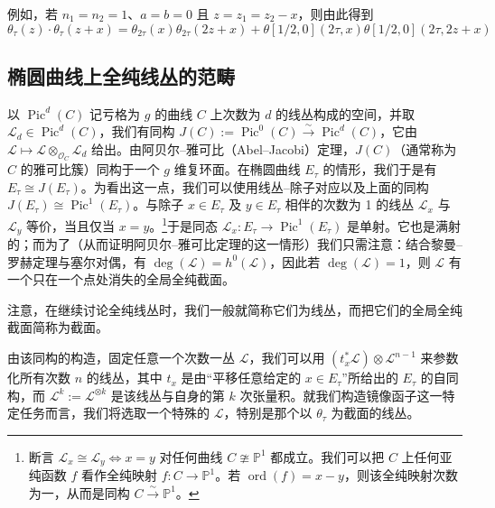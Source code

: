 \documentclass[11pt,a4paper]{article}
\theoremstyle{plain}
\theoremstyle{definition}
\begin{document}
例如，若 $n_1=n_2=1$、$a=b=0$ 且 $z=z_1=z_2-x$，则由此得到
\begin{equation}
\tag{4.1}
\theta_\tau(z)\cdot\theta_\tau(z+x)=\theta_{2\tau}(x)\theta_{2\tau}(2z+x)+\theta[1/2,0](2\tau,x)\theta[1/2,0](2\tau,2z+x)
\end{equation}

\subsection{椭圆曲线上全纯线丛的范畴}

以 $\operatorname{Pic}^d(C)$ 记亏格为 $g$ 的曲线 $C$ 上次数为 $d$ 的线丛构成的空间，并取 $\mathcal{L}_d\in\operatorname{Pic}^d(C)$，我们有同构 $J(C):=\operatorname{Pic}^0(C)\xrightarrow{\ \sim\ }\operatorname{Pic}^d(C)$，它由 $\mathcal{L}\mapsto\mathcal{L}\otimes_{\mathcal{O}_C}\mathcal{L}_d$ 给出。由阿贝尔–雅可比（Abel--Jacobi）定理，$J(C)$（通常称为 $C$ 的雅可比簇）同构于一个 $g$ 维复环面。在椭圆曲线 $E_\tau$ 的情形，我们于是有 $E_\tau\cong J(E_\tau)$。为看出这一点，我们可以使用线丛–除子对应以及上面的同构 $J(E_\tau)\cong\operatorname{Pic}^1(E_\tau)$。与除子 $x\in E_\tau$ 及 $y\in E_\tau$ 相伴的次数为 1 的线丛 $\mathcal{L}_x$ 与 $\mathcal{L}_y$ 等价，当且仅当 $x=y$。\footnote{断言 $\mathcal{L}_x\cong\mathcal{L}_y\iff x=y$ 对任何曲线 $C\ncong\mathbb{P}^1$ 都成立。我们可以把 $C$ 上任何亚纯函数 $f$ 看作全纯映射 $f\colon C\to\mathbb{P}^1$。若 $\operatorname{ord}(f)=x-y$，则该全纯映射次数为一，从而是同构 $C\xrightarrow{\sim}\mathbb{P}^1$。}于是同态 $\mathcal{L}_x\colon E_\tau\to\operatorname{Pic}^1(E_\tau)$ 是单射。它也是满射的；而为了（从而证明阿贝尔–雅可比定理的这一情形）我们只需注意：结合黎曼–罗赫定理与塞尔对偶，有 $\deg(\mathcal{L})=h^0(\mathcal{L})$，因此若 $\deg(\mathcal{L})=1$，则 $\mathcal{L}$ 有一个只在一个点处消失的全局全纯截面。

注意，在继续讨论全纯线丛时，我们一般就简称它们为线丛，而把它们的全局全纯截面简称为截面。

由该同构的构造，固定任意一个次数一丛 $\mathcal{L}$，我们可以用 $(t_x^*\mathcal{L})\otimes\mathcal{L}^{n-1}$ 来参数化所有次数 $n$ 的线丛，其中 $t_x$ 是由“平移任意给定的 $x\in E_\tau$”所给出的 $E_\tau$ 的自同构，而 $\mathcal{L}^k:=\mathcal{L}^{\otimes k}$ 是该线丛与自身的第 $k$ 次张量积。就我们构造镜像函子这一特定任务而言，我们将选取一个特殊的 $\mathcal{L}$，特别是那个以 $\theta_\tau$ 为截面的线丛。
\end{document}
